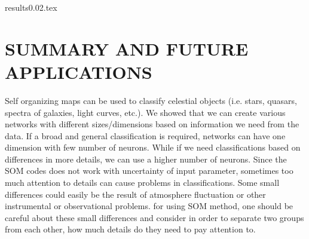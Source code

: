 \documentclass[useAMS,usenatbib]{mn2e}
\begin{document}
{results0.02.tex}


\section{SUMMARY AND FUTURE APPLICATIONS}
\label{sec: summary}

Self organizing maps can be used to classify celestial objects (i.e. stars, quasars, spectra of galaxies, light curves, etc.).
We showed that we can create various networks with different sizes/dimensions based on information we need from the data. 
If a broad and general classification is required, networks can have one dimension with few number of neurons.
While if we need classifications based on differences in more details, we can use a higher number of neurons.
Since the SOM codes does not work with uncertainty of input parameter, sometimes too much attention to details can cause problems in classifications. 
Some small differences could easily be the result of atmosphere fluctuation or other instrumental or observational problems. 
for using SOM method, one should be careful about these small differences and consider in order to separate two groups from each other, how much details do they need to pay attention to.
\end{document}
